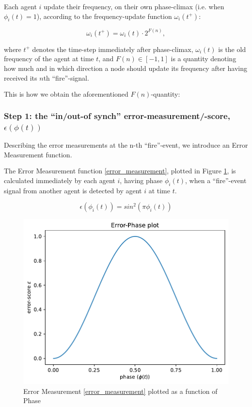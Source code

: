 	Each agent $i$ update their frequency, on their own phase-climax (i.e. when $\phi_i(t)=1$), according to the frequency-update function $\omega_i(t^+)$:
	
	\begin{equation}
		\omega_i(t^+) = \omega_i(t) \cdot 2^{F(n)},
	\end{equation}
	
	where $t^+$ denotes the time-step immediately after phase-climax, $\omega_i(t)$ is the old frequency of the agent at time $t$, and $F(n) \in [-1,1]$ is a quantity denoting how much and in which direction a node should update its frequency after having received its $n$th ``fire''-signal.
	
	This is how we obtain the aforementioned $F(n)$-quantity:
	
	
	\subsubsection{Step 1: the ``in/out-of synch'' error-measurement/-score, $\epsilon(\phi(t))$}
	
	Describing the error measurements at the n-th ``fire''-event, we introduce an Error Measurement function.
	
	The Error Measurement function \eqref{error_measurement}, plotted in Figure \ref{fig:error_measurement}, is calculated immediately by each agent $i$, having phase $\phi_i(t)$, when a ``fire''-event signal from another agent is detected by agent $i$ at time $t$.
	
	\begin{equation}
	\label{error_measurement}
		\epsilon(\phi_i(t)) = sin^2(\pi\phi_i(t))
	\end{equation} \nl
	
	\begin{figure}[h!]
		\centering
		\includegraphics[width=0.8\linewidth]{Assets/Figures/PhaseErrorFunction.pdf}
		\caption{Error Measurement \eqref{error_measurement} plotted as a function of Phase}
		\label{fig:error_measurement}
	\end{figure}
	

